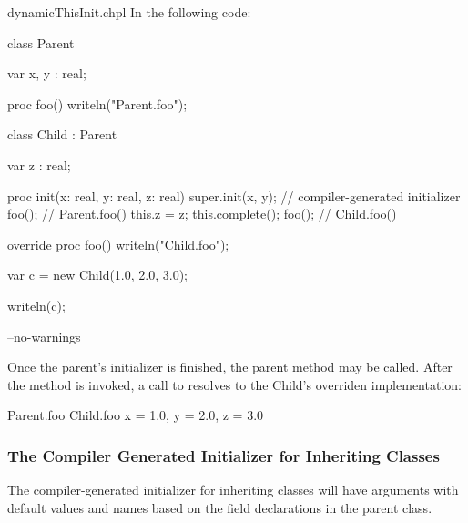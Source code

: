 \begin{chapelexample}{dynamicThisInit.chpl}
In the following code:
\begin{chapel}
class Parent {
  var x, y : real;

  proc foo() {
    writeln("Parent.foo");
  }
}

class Child : Parent {
  var z : real;

  proc init(x: real, y: real, z: real) {
    super.init(x, y); // compiler-generated initializer
    foo(); // Parent.foo()
    this.z = z;
    this.complete();
    foo(); // Child.foo()
  }

  override proc foo() {
    writeln("Child.foo");
  }
}

var c = new Child(1.0, 2.0, 3.0);
\end{chapel}
\begin{chapelpost}
writeln(c);
\end{chapelpost}
\begin{chapelcompopts}
--no-warnings
\end{chapelcompopts}
Once the parent's initializer is finished, the parent method
 may be called. After the  method is invoked, a call to 
resolves to the Child's overriden implementation:
\begin{chapelprintoutput}{}
Parent.foo
Child.foo
{x = 1.0, y = 2.0, z = 3.0}
\end{chapelprintoutput}
\end{chapelexample}

\subsubsection{The Compiler Generated Initializer for Inheriting Classes}
\label{The_Compiler_Generated_Initializer_for_Inheriting_Classes}

The compiler-generated initializer for inheriting classes will have arguments
with default values and names based on the field declarations in the parent
class.

